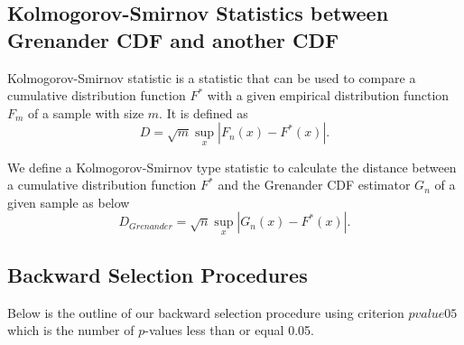 \documentclass[12pt, letter]{article}\usepackage[]{graphicx}\usepackage[]{color}
\begin{document}
\subsection{Kolmogorov-Smirnov Statistics between Grenander CDF and another CDF}
Kolmogorov-Smirnov statistic is a statistic that can be used to compare a cumulative distribution function $F^*$ with a given empirical distribution function $F_m$ of a sample with size $m$.  It is defined as
\[
D  = \sqrt{m}\sup_{x} |F_n(x)-F^*(x)|.
\]

We define a  Kolmogorov-Smirnov type statistic to calculate the distance between a cumulative distribution function $F^*$ and the Grenander CDF estimator $G_n$  of a given sample as below
\[
D_{Grenander} = \sqrt{n} \sup_{x} |G_n(x)-F^*(x)|.
\]

\subsection{ Backward Selection Procedures}
Below is the outline of our backward selection procedure using criterion $pvalue05$ which is the number of $p$-values less than or equal 0.05. 
\end{document}
